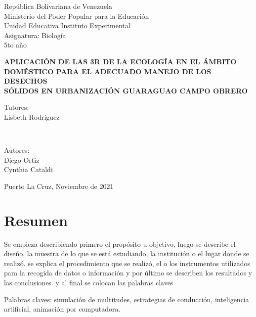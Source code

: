 \setcounter{page}{2}
\begin{center}
República Bolivariana de Venezuela\\[0.1cm] 
Ministerio del Poder Popular para la Educación\\[0.1cm]
Unidad Educativa Instituto Experimental\\[0.1cm] 
Asignatura: Biología\\[0.1cm] 
5to año\\[0.1cm] 
\end{center}

\vspace*{0.5cm}
\begin{center}
    \textbf{\large{APLICACIÓN DE LAS 3R DE LA ECOLOGÍA EN EL ÁMBITO\\[0.1cm]
    DOMÉSTICO PARA EL ADECUADO MANEJO DE LOS DESECHOS\\[0.2cm]
    SÓLIDOS EN URBANIZACIÓN GUARAGUAO CAMPO OBRERO}}\\[0.1cm]
\end{center}

\vspace*{0.5cm}
\begin{minipage}{0.4\textwidth}
\begin{flushleft}
\textup{Tutores:}\\
\textup{Lisbeth Rodríguez}
\end{flushleft}
\end{minipage}
~
\begin{minipage}{0.4\textwidth}
\begin{flushright}
\textup{Autores:} \\
Diego Ortiz\\
Cynthia Cataldi
\end{flushright}
\end{minipage}
\vspace*{0.5cm}
\begin{center}
Puerto La Cruz, Noviembre de 2021
\end{center}
\vspace*{1cm}

\chapter*{Resumen}

Se empieza describiendo primero el propósito u objetivo, luego se describe el diseño, la muestra de lo que se está estudiando, la institución o el lugar donde se realizó. se explica el procedimiento que se realizó, el o los instrumentos utilizados para la recogida de datos o información y por último se describen los resultados y las conclusiones. y al final se colocan las palabras claves

Palabras claves: simulación de multitudes, estrategias de conducción, inteligencia artificial, animación por computadora.

\newpage